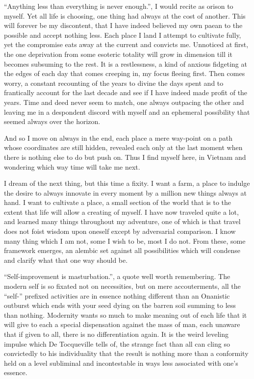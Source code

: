\documentclass[ebook, 10pt, openright, onecolumn]{memoir}
\newcommand*\td[1]{
  \todo[inline]{
     #1 
  }
}
\newcommand*\finish{\td{ ----- Finish this section -----}}
\begin{document}
``Anything less than everything is never enough.'', I would recite as orison to
myself.  Yet all life is choosing, one thing had always at the cost of another.
This will forever be my discontent, that I have indeed believed my own paean to
the possible and accept nothing less.  Each place I land I attempt to cultivate
fully, yet the compromise eats away at the current and convicts me.  Unnoticed
at first, the one deprivation from some esoteric totality will grow in dimension
till it becomes subsuming to the rest.  It is a restlessness, a kind of anxious
fidgeting at the edges of each day that comes creeping in, my focus fleeing
first.  Then comes worry, a constant recounting of the years to divine the days
spent and to frantically account for the last decade and see if I have indeed
made profit of the years.  Time and deed never seem to match, one always
outpacing the other and leaving me in a despondent discord with myself and an
ephemeral possibility that seemed always over the horizon.

And so I move on always in the end, each place a mere way-point on a path whose
coordinates are still hidden, revealed each only at the last moment when there
is nothing else to do but push on.  Thus I find myself here, in Vietnam and
wondering which way time will take me next.

I  dream of the next thing, but this time a fixity.  I want a farm, a place to
indulge the desire to always innovate in every moment by a million new things
always at hand.  I want to cultivate a place, a small section of the world that
is to the extent that life will allow a creating of myself.  I have now traveled
quite a lot, and learned many things throughout my adventure, one of which is
that travel does not foist wisdom upon oneself except by adversarial
comparison.  I know many thing which I am not, some I wish to be, most I do
not.  From these, some framework emerges, an alembic set against all
possibilities which will condense and clarify what that one way should be.

\finish{}

``Self-improvement is masturbation.'', a quote well worth remembering.  The
modern self is so fixated not on necessities, but on mere accouterments, all the
``self-'' prefixed activities are in essence nothing different than an Onanistic
outburst which ends with your seed dying on the barren soil summing to less than
nothing.  Modernity wants so much to make meaning out of each life that it will
give to each a special dispensation against the mass of man, each unaware that
if given to all, there is no differentiation again.  It is the weird leveling
impulse which De Tocqueville tells of, the strange fact than all can cling so
convictedly to his individuality that the result is nothing more than a
conformity held on a level subliminal and incontestable in ways less associated
with one's essence.
\end{document}
